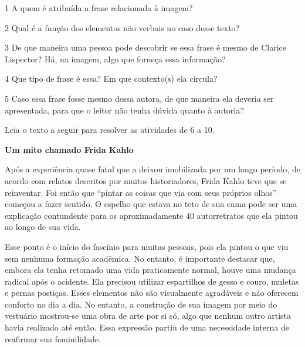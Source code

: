 \num{1} A quem é atribuída a frase relacionada à imagem?


\num{2} Qual é a função dos elementos não verbais no caso desse texto?


\num{3} De que maneira uma pessoa pode descobrir se essa frase é mesmo
de Clarice Lispector? Há, na imagem, algo que forneça essa informação?


\num{4} Que tipo de frase é essa? Em que contexto(s) ela circula?


\num{5} Caso essa frase fosse mesmo dessa autora, de que maneira ela
deveria ser apresentada, para que o leitor não tenha dúvida quanto à
autoria?


Leia o texto a seguir para resolver as atividades de 6 a 10.

\begin{myquote}
\begin{center}
\textbf{Um mito chamado Frida Kahlo}
\end{center}

\noindent Após a experiência quase fatal que a deixou imobilizada por um longo
período, de acordo com relatos descritos por muitos historiadores, Frida
Kahlo teve que se reinventar. Foi então que ``pintar as coisas que via
com seus próprios olhos'' começou a fazer sentido. O espelho que estava
no teto de sua cama pode ser uma explicação contundente para os
aproximadamente 40 autorretratos que ela pintou ao longo de sua vida.

Esse ponto é o início do fascínio para muitas pessoas, pois ela pintou o
que viu sem nenhuma formação acadêmica. No entanto, é importante
destacar que, embora ela tenha retomado uma vida praticamente normal,
houve uma mudança radical após o acidente. Ela precisou utilizar
espartilhos de gesso e couro, muletas e pernas postiças. Esses elementos
não são visualmente agradáveis e não oferecem conforto no dia a dia. No
entanto, a construção de sua imagem por meio do vestuário mostrou-se uma
obra de arte por si só, algo que nenhum outro artista havia realizado
até então. Essa expressão partiu de uma necessidade interna de reafirmar
sua feminilidade.

\end{myquote}

